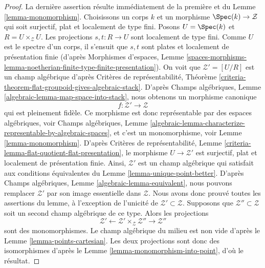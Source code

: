 \begin{proof}
La dernière assertion résulte immédiatement de la première et du
Lemme \ref{lemma-monomorphism}.
Choisissons un corps $k$ et un morphisme $\Spec(k) \to \mathcal{Z}$
qui soit surjectif, plat et localement de type fini.
Posons $U = \Spec(k)$ et $R = U \times_\mathcal{Z} U$.
Les projections $s, t : R \to U$ sont localement de type fini.
Comme $U$ est le spectre d'un corps, il s'ensuit que
$s, t$ sont plates et localement de présentation finie (d'après
Morphismes d'espaces, Lemme
\ref{spaces-morphisms-lemma-noetherian-finite-type-finite-presentation}).
On voit que $\mathcal{Z}' = [U/R]$ est un champ algébrique d'après
Critères de représentabilité,
Théorème \ref{criteria-theorem-flat-groupoid-gives-algebraic-stack}.
D'après
Champs algébriques, Lemme \ref{algebraic-lemma-map-space-into-stack},
nous obtenons un morphisme canonique
$$
f : \mathcal{Z}' \longrightarrow \mathcal{Z}
$$
qui est pleinement fidèle. Ce morphisme est donc représentable par des
espaces algébriques, voir
Champs algébriques, Lemme
\ref{algebraic-lemma-characterize-representable-by-algebraic-spaces},
et c'est un monomorphisme, voir
Lemme \ref{lemma-monomorphism}.
D'après
Critères de représentabilité,
Lemme \ref{criteria-lemma-flat-quotient-flat-presentation},
le morphisme $U \to \mathcal{Z}'$ est surjectif, plat et localement de
présentation finie. Ainsi, $\mathcal{Z}'$ est un champ algébrique qui satisfait
aux conditions équivalentes du
Lemme \ref{lemma-unique-point-better}.
D'après
Champs algébriques, Lemme \ref{algebraic-lemma-equivalent},
nous pouvons remplacer $\mathcal{Z}'$ par son image essentielle dans $\mathcal{Z}$.
Nous avons donc prouvé toutes les assertions du lemme, à l'exception de
l'unicité de $\mathcal{Z}' \subset \mathcal{Z}$. Supposons que
$\mathcal{Z}'' \subset \mathcal{Z}$ soit un second champ algébrique de ce type.
Alors les projections
$$
\mathcal{Z}'
\longleftarrow
\mathcal{Z}' \times_\mathcal{Z} \mathcal{Z}''
\longrightarrow
\mathcal{Z}''
$$
sont des monomorphismes. Le champ algébrique du milieu est non vide d'après le
Lemme \ref{lemma-points-cartesian}.
Les deux projections sont donc des isomorphismes d'après le
Lemme \ref{lemma-monomorphism-into-point},
d'où le résultat.
\end{proof}


